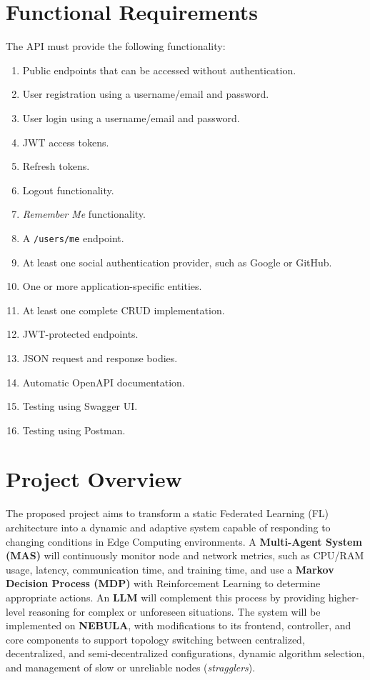 \documentclass[9pt,a4paper,twocolumn]{article}
\begin{document}
\section{Functional Requirements}
The API must provide the following functionality:
\begin{enumerate}
    \item Public endpoints that can be accessed without authentication.
    \item User registration using a username/email and password.
    \item User login using a username/email and password.
    \item JWT access tokens.
    \item Refresh tokens.
    \item Logout functionality.
    \item \textit{Remember Me} functionality.
    \item A \texttt{/users/me} endpoint.
    \item At least one social authentication provider, such as Google or GitHub.
    \item One or more application-specific entities.
    \item At least one complete CRUD implementation.
    \item JWT-protected endpoints.
    \item JSON request and response bodies.
    \item Automatic OpenAPI documentation.
    \item Testing using Swagger UI.
    \item Testing using Postman.
\end{enumerate}

\section{Project Overview}
The proposed project aims to transform a static Federated Learning (FL) architecture into a dynamic and adaptive system capable of responding to changing conditions in Edge Computing environments. A \textbf{Multi-Agent System (MAS)} will continuously monitor node and network metrics, such as CPU/RAM usage, latency, communication time, and training time, and use a \textbf{Markov Decision Process (MDP)} with Reinforcement Learning to determine appropriate actions. An \textbf{LLM} will complement this process by providing higher-level reasoning for complex or unforeseen situations. The system will be implemented on \textbf{NEBULA}, with modifications to its frontend, controller, and core components to support topology switching between centralized, decentralized, and semi-decentralized configurations, dynamic algorithm selection, and management of slow or unreliable nodes (\textit{stragglers}).
\end{document}
